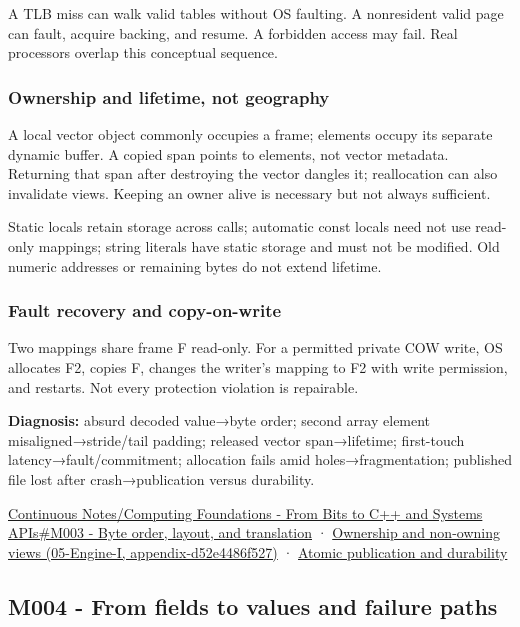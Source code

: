 A TLB miss can walk valid tables without OS faulting. A nonresident valid page can fault, acquire backing, and resume. A forbidden access may fail. Real processors overlap this conceptual sequence.

\subsubsection{Ownership and lifetime, not geography}\label{appendix-92ff77d4dfdc-ownership-and-lifetime-not-geography}

A local vector object commonly occupies a frame; elements occupy its separate dynamic buffer. A copied span points to elements, not vector metadata. Returning that span after destroying the vector dangles it; reallocation can also invalidate views. Keeping an owner alive is necessary but not always sufficient.

Static locals retain storage across calls; automatic const locals need not use read-only mappings; string literals have static storage and must not be modified. Old numeric addresses or remaining bytes do not extend lifetime.

\subsubsection{Fault recovery and copy-on-write}\label{appendix-92ff77d4dfdc-fault-recovery-and-copy-on-write}

Two mappings share frame F read-only. For a permitted private COW write, OS allocates F2, copies F, changes the writer's mapping to F2 with write permission, and restarts. Not every protection violation is repairable.

\textbf{Diagnosis:} absurd decoded value→byte order; second array element misaligned→stride/tail padding; released vector span→lifetime; first-touch latency→fault/commitment; allocation fails amid holes→fragmentation; published file lost after crash→publication versus durability.

\hyperref[01-foundations-i-ch011-m003---byte-order-layout-and-translation]{Continuous Notes/Computing Foundations - From Bits to C++ and Systems APIs\#M003 - Byte order, layout, and translation} · \href{../05-Engine-I/main.pdf\#nameddest=appendix-d52e4486f527}{Ownership and non-owning views (05-Engine-I, appendix-d52e4486f527)} · \hyperref[appendix-e89a8f290ef5]{Atomic publication and durability}

\subsection{M004 - From fields to values and failure paths}\label{appendix-92ff77d4dfdc-m004---from-fields-to-values-and-failure-paths}

